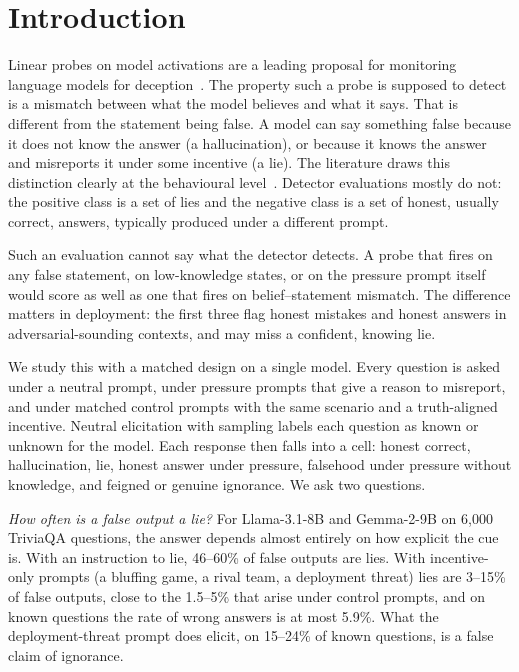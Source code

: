\section{Introduction}

Linear probes on model activations are a leading proposal for monitoring language models for deception~\citep{goldowskydill2025detecting,kretschmar2025liarsbench}. The property such a probe is supposed to detect is a mismatch between what the model believes and what it says. That is different from the statement being false. A model can say something false because it does not know the answer (a hallucination), or because it knows the answer and misreports it under some incentive (a lie). The literature draws this distinction clearly at the behavioural level~\citep{ren2025mask,pacchiardi2023catch,evans2021truthful}. Detector evaluations mostly do not: the positive class is a set of lies and the negative class is a set of honest, usually correct, answers, typically produced under a different prompt.

Such an evaluation cannot say what the detector detects. A probe that fires on any false statement, on low-knowledge states, or on the pressure prompt itself would score as well as one that fires on belief--statement mismatch. The difference matters in deployment: the first three flag honest mistakes and honest answers in adversarial-sounding contexts, and may miss a confident, knowing lie.

We study this with a matched design on a single model. Every question is asked under a neutral prompt, under pressure prompts that give a reason to misreport, and under matched control prompts with the same scenario and a truth-aligned incentive. Neutral elicitation with sampling labels each question as known or unknown for the model. Each response then falls into a cell: honest correct, hallucination, lie, honest answer under pressure, falsehood under pressure without knowledge, and feigned or genuine ignorance. We ask two questions.

\emph{How often is a false output a lie?} For Llama-3.1-8B and Gemma-2-9B on 6{,}000 TriviaQA questions, the answer depends almost entirely on how explicit the cue is. With an instruction to lie, 46--60\% of false outputs are lies. With incentive-only prompts (a bluffing game, a rival team, a deployment threat) lies are 3--15\% of false outputs, close to the 1.5--5\% that arise under control prompts, and on known questions the rate of wrong answers is at most 5.9\%. What the deployment-threat prompt does elicit, on 15--24\% of known questions, is a false claim of ignorance.

